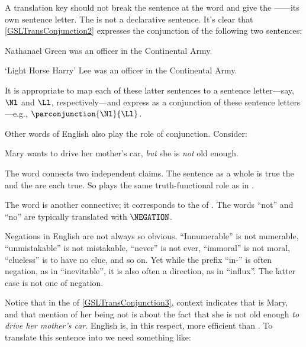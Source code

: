 \noindent{}A translation key should not break the sentence at the word  and give the ------its own sentence letter.
The  is not a declarative sentence.
It's clear that \ref{GSLTransConjunction2} expresses the conjunction of the following two sentences:

\begin{menumerate}
	\item Nathanael Green was an officer in the Continental Army.
	\item `Light Horse Harry' Lee was an officer in the Continental Army.
\end{menumerate}

\noindent{}It is appropriate to map each of these latter sentences to a sentence letter---say, $\Nl$ and $\Ll$, respectively---and express  as a conjunction of these sentence letters---e.g., $\parconjunction{\Nl}{\Ll}$.

Other words of English also play the role of conjunction. Consider:

\begin{menumerate}
	\item\label{GSLTransConjunction3} Mary wants to drive her mother's car, \emph{but} she is \emph{not} old enough.
\end{menumerate}

\noindent{}The word  connects two independent claims.
The sentence as a whole is true \Iff the  and the  are each true.
So  plays the same truth-functional role as \mention{$\WEDGE$} in \GSL{}.

The word  is another connective; it corresponds to the \mention{$\NEGATION$} of \GSL{}. 
The words ``not'' and ``no'' are typically translated with $\NEGATION$. 

Negations in English are not always so obvious.
``Innumerable'' is not numerable, ``unmistakable'' is not mistakable, ``never'' is not ever, ``immoral'' is not moral, ``clueless'' is to have no clue, and so on. 
Yet while the prefix ``in-'' is often negation, as in ``inevitable'', it is also often a direction, as in ``influx''.
The latter case is not one of negation.

Notice that in the  of \ref{GSLTransConjunction3}, context indicates that  is Mary, and that mention of her being not  is about the fact that she is not old enough \emph{to drive her mother's car}.
English is, in this respect, more efficient than \GSL{}.
To translate this sentence into \GSL{} we need something like:

